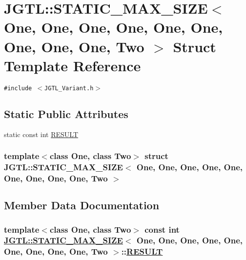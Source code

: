 \hypertarget{struct_j_g_t_l_1_1_s_t_a_t_i_c___m_a_x___s_i_z_e_3_01_one_00_01_one_00_01_one_00_01_one_00_01_on8bad4fe85b3207b51b4ba282cb73273e}{
\section{JGTL::STATIC\_\-MAX\_\-SIZE$<$ One, One, One, One, One, One, One, One, One, Two $>$ Struct Template Reference}
\label{struct_j_g_t_l_1_1_s_t_a_t_i_c___m_a_x___s_i_z_e_3_01_one_00_01_one_00_01_one_00_01_one_00_01_on8bad4fe85b3207b51b4ba282cb73273e}
}
{\tt \#include $<$JGTL\_\-Variant.h$>$}

\subsection*{Static Public Attributes}
\begin{CompactItemize}
\item 
static const int \hyperlink{struct_j_g_t_l_1_1_s_t_a_t_i_c___m_a_x___s_i_z_e_3_01_one_00_01_one_00_01_one_00_01_one_00_01_on8bad4fe85b3207b51b4ba282cb73273e_5b5ccc194f236604d77f475aacbf3405}{RESULT}
\end{CompactItemize}
\subsubsection*{template$<$class One, class Two$>$ struct JGTL::STATIC\_\-MAX\_\-SIZE$<$ One, One, One, One, One, One, One, One, One, Two $>$}



\subsection{Member Data Documentation}
\hypertarget{struct_j_g_t_l_1_1_s_t_a_t_i_c___m_a_x___s_i_z_e_3_01_one_00_01_one_00_01_one_00_01_one_00_01_on8bad4fe85b3207b51b4ba282cb73273e_5b5ccc194f236604d77f475aacbf3405}{
\subsubsection[RESULT]{\setlength{\rightskip}{0pt plus 5cm}template$<$class One, class Two$>$ const int \hyperlink{struct_j_g_t_l_1_1_s_t_a_t_i_c___m_a_x___s_i_z_e}{JGTL::STATIC\_\-MAX\_\-SIZE}$<$ One, One, One, One, One, One, One, One, One, Two $>$::\hyperlink{struct_j_g_t_l_1_1_s_t_a_t_i_c___m_a_x___s_i_z_e_3_01_one_00_01_one_00_01_one_00_01_one_00_01_on8bad4fe85b3207b51b4ba282cb73273e_5b5ccc194f236604d77f475aacbf3405}{RESULT}}}
\label{struct_j_g_t_l_1_1_s_t_a_t_i_c___m_a_x___s_i_z_e_3_01_one_00_01_one_00_01_one_00_01_one_00_01_on8bad4fe85b3207b51b4ba282cb73273e_5b5ccc194f236604d77f475aacbf3405}


